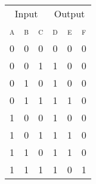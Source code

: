 \documentclass{standalone}
\newcommand\lightrule{%
	\arrayrulecolor{black!30}%
	\midrule[\lightrulewidth]%
	\arrayrulecolor{black}}
\begin{document}
\begin{tabular}{*{6}{c}}
	\toprule
		\multicolumn{3}{c}{Input} & \multicolumn{3}{c}{Output}\\
		\cmidrule(lr){1-3} \cmidrule(lr){4-6}
		\textsc{a} & \textsc{b} & \textsc{c} & \textsc{d} & \textsc{e} & \textsc{f} \\
	\midrule
		0 & 0 & 0 & 0 & 0 & 0 \\\lightrule
		0 & 0 & 1 & 1 & 0 & 0 \\\lightrule
		0 & 1 & 0 & 1 & 0 & 0 \\\lightrule
		0 & 1 & 1 & 1 & 1 & 0 \\\lightrule
		1 & 0 & 0 & 1 & 0 & 0 \\\lightrule
		1 & 0 & 1 & 1 & 1 & 0 \\\lightrule
		1 & 1 & 0 & 1 & 1 & 0 \\\lightrule
		1 & 1 & 1 & 1 & 0 & 1 \\
		\bottomrule
\end{tabular}
\end{document}
